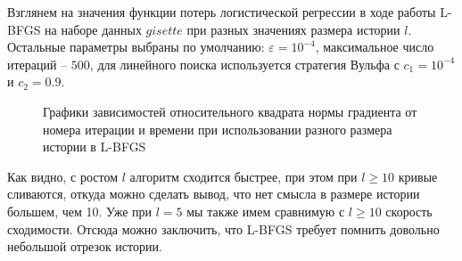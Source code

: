 \documentclass[11pt]{article}
\begin{document}
Взглянем на значения функции потерь логистической регрессии в ходе работы L-BFGS на наборе данных $gisette$ при разных значениях размера истории $l$.
Остальные параметры выбраны по умолчанию: $\varepsilon=10^{-4}$, максимальное число итераций -- $500$, для линейного поиска используется стратегия Вульфа с $c_1=10^{-4}$ и $c_2=0.9$.
\newpage
\begin{figure}[H]
	\captionsetup{font=scriptsize}

	\centering

   \captionsetup{justification=centering}
   \caption{Графики зависимостей относительного квадрата нормы градиента от номера итерации и времени при использовании разного размера истории в L-BFGS}

\label{fig:gd_strategies_logreg}
\end{figure} 

Как видно, с ростом $l$ алгоритм сходится быстрее, при этом при $l \ge 10$ кривые сливаются, откуда можно сделать вывод, что нет смысла в размере истории большем, чем 10. Уже при $l=5$ мы также имем сравнимую с $l \ge 10$ скорость сходимости. Отсюда можно заключить, что L-BFGS требует помнить довольно небольшой отрезок истории.
\end{document}
